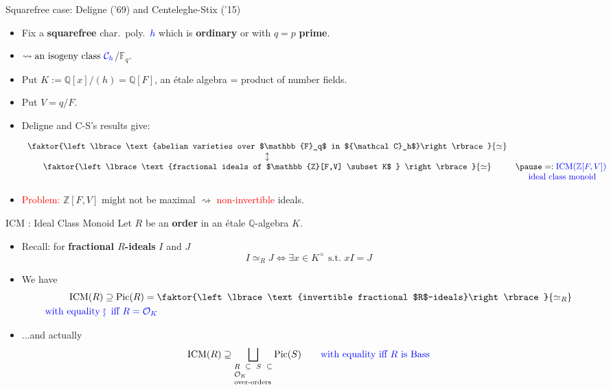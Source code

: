 \documentclass[usenames,dvipsnames,handout]{beamer}
\def\Q{\mathbb{Q}}
\def\Z{\mathbb{Z}}
\def\F{\mathbb{F}}
\DeclareMathOperator{\ICM}{ICM}
\DeclareMathOperator{\Pic}{Pic}
\newcommand{\cC}{{\mathcal C}}
\newcommand{\cO}{{\mathcal O}}
\newcommand{\set}[1]{\left\lbrace#1\right\rbrace }
\newcommand{\red}[1]{\textcolor{red}{#1}}
\newcommand{\blue}[1]{\textcolor{blue}{#1}}
\begin{document}
\begin{frame}{Squarefree case: Deligne ('69) and Centeleghe-Stix ('15)}
	\begin{itemize}
    \item Fix a \textbf{squarefree} char.~poly.~\blue{$h$} which is {\bf ordinary} or with $q=p$ {\bf prime}.
\pause  
    \item  $\rightsquigarrow \text{an isogeny class } \blue{\cC_h}$/$\F_q$.
\pause 
    \item Put $K := \Q[x]/(h)=\Q[F]$, an \'etale algebra = product of number fields.
	\item Put $V=q/F$. 
\pause
    \item Deligne and C-S's results give:
\pause
			\begin{theorem}
			\[\begin{array}{cc}
			\faktor{\set{\text{abelian varieties over $\F_q$ in $\cC_h$}}}{\simeq} & \\
			\updownarrow & \\
			\faktor{\set{ \text{fractional ideals of $\Z[F,V] \subset K$ } }}{\simeq} &
\pause =:  \blue{\ICM(\Z[F,V])}\\ 
			& \blue{\text{ ideal class monoid} }
			  \end{array}\]
			\end{theorem}
\pause
    \item \red{Problem:} $\Z[F,V]$ might not be maximal $\rightsquigarrow $ \red{non-invertible} ideals.
	\end{itemize}
\end{frame}

\begin{frame}{ICM : Ideal Class Monoid}
    Let $R$ be an {\bf order} in an \'etale  $\Q$-algebra $K$.
    \begin{itemize}
\pause
    \item Recall: for {\bf fractional $R$-ideals} $I$ and $J$
	 \[ I\simeq_R J \Longleftrightarrow \exists x \in K^\times \text{ s.t.~} xI=J \]
\pause
    \item We have
   	\begin{align*}
    \ICM(R) & \supseteq \Pic(R)=\faktor{\set{\text{invertible fractional $R$-ideals}}}{\simeq_R} \\
	\blue{\text{with equality }} & \blue{\rotatebox[origin=c]{90}{$\large\rightsquigarrow$}\mkern2mu \text{ iff } R=\cO_K }
    \end{align*}
\pause 
    \item ...and actually
    \[ \ICM(R) \supseteq \bigsqcup_{\scriptsize\parbox{5 em}{$R\subseteq S \subseteq \cO_K$\\over-orders}}\Pic(S) \qquad   
     \textcolor{blue}{\text{with equality iff $R$ is Bass}} \]
\end{itemize}
\end{frame}
\end{document}
